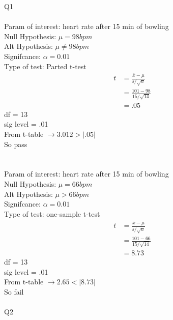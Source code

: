 \documentclass{article}
\begin{document}
Q1\\\\

Param of interest: heart rate after 15 min of bowling\\
Null Hypothesis: $\mu = 98bpm$\\
Alt Hypothesis: $\mu \neq 98bpm$\\
Signifcance: $\alpha = 0.01$\\
Type of test: Parted t-test\\
\begin{equation*}
\begin{split}
    t & = \frac{\overline{x} - \mu}{s / \sqrt{n}}\\
    & = \frac{101-98}{15/\sqrt{14}}\\
    & = .05
\end{split}
\end{equation*}
df = 13\\
sig level = .01\\
From t-table $\rightarrow 3.012 > |.05|$ \\
So pass \\ \\ \\

Param of interest: heart rate after 15 min of bowling\\
Null Hypothesis: $\mu = 66bpm$\\
Alt Hypothesis: $\mu > 66bpm$\\
Signifcance: $\alpha = 0.01$\\
Type of test: one-sample t-test\\
\begin{equation*}
\begin{split}
    t & = \frac{\overline{x} - \mu}{s / \sqrt{n}}\\
    & = \frac{101-66}{15/\sqrt{14}}\\
    & = 8.73
\end{split}
\end{equation*}
df = 13\\
sig level = .01\\
From t-table $\rightarrow 2.65 < |8.73|$ \\
So fail\\\\


Q2\\\\
\end{document}
